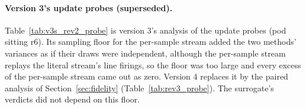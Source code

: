

\paragraph{Version 3's update probes (superseded).} Table~\ref{tab:v3s_rev2_probe} is version 3's analysis of the update
probes (pod sitting r6). Its sampling floor for the per-sample stream added the two methods' variances as if their draws were
independent, although the per-sample stream replays the literal stream's line firings, so the floor was too large and every
excess of the per-sample stream came out as zero. Version 4 replaces it by the paired analysis of Section~\ref{sec:fidelity}
(Table~\ref{tab:rev3_probe}). The surrogate's verdicts did not depend on this floor.


